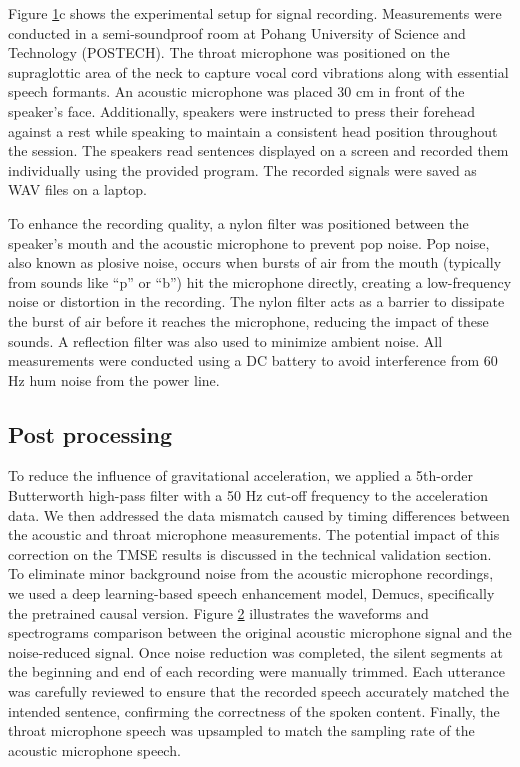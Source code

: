 \documentclass[10pt]{wlscirep}
\begin{document}
Figure \hyperref[fig:1]{1}c shows the experimental setup for signal recording. Measurements were conducted in a semi-soundproof room at Pohang University of Science and Technology (POSTECH). The throat microphone was positioned on the supraglottic area of the neck to capture vocal cord vibrations along with essential speech formants\cite{song2021study}. An acoustic microphone was placed 30 cm in front of the speaker’s face. Additionally, speakers were instructed to press their forehead against a rest while speaking to maintain a consistent head position throughout the session. The speakers read sentences displayed on a screen and recorded them individually using the provided program. The recorded signals were saved as WAV files on a laptop.

To enhance the recording quality, a nylon filter was positioned between the speaker's mouth and the acoustic microphone to prevent pop noise. Pop noise, also known as plosive noise, occurs when bursts of air from the mouth (typically from sounds like ``p'' or ``b'') hit the microphone directly, creating a low-frequency noise or distortion in the recording. The nylon filter acts as a barrier to dissipate the burst of air before it reaches the microphone, reducing the impact of these sounds. A reflection filter was also used to minimize ambient noise. All measurements were conducted using a DC battery to avoid interference from 60 Hz hum noise from the power line. 

\subsection*{Post processing}
To reduce the influence of gravitational acceleration, we applied a 5th-order Butterworth high-pass filter with a 50 Hz cut-off frequency to the acceleration data. We then addressed the data mismatch caused by timing differences between the acoustic and throat microphone measurements. The potential impact of this correction on the TMSE results is discussed in the technical validation section. To eliminate minor background noise from the acoustic microphone recordings, we used a deep learning-based speech enhancement model, Demucs\cite{defossez2020real}, specifically the pretrained causal version. Figure \hyperref[fig:2]{2} illustrates the waveforms and spectrograms comparison between the original acoustic microphone signal and the noise-reduced signal. Once noise reduction was completed, the silent segments at the beginning and end of each recording were manually trimmed. Each utterance was carefully reviewed to ensure that the recorded speech accurately matched the intended sentence, confirming the correctness of the spoken content. Finally, the throat microphone speech was upsampled to match the sampling rate of the acoustic microphone speech.
\end{document}
